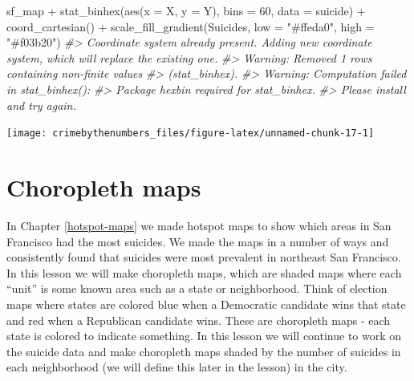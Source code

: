 \documentclass[
  12pt,
  openany]{book}
\newenvironment{Shaded}{\begin{snugshade}}{\end{snugshade}}
\newcommand{\AttributeTok}[1]{\textcolor[rgb]{0.61,0.61,0.61}{#1}}
\newcommand{\CommentTok}[1]{\textcolor[rgb]{0.37,0.37,0.37}{\textit{#1}}}
\newcommand{\DecValTok}[1]{\textcolor[rgb]{0.06,0.06,0.06}{#1}}
\newcommand{\FunctionTok}[1]{\textcolor[rgb]{0,0,0}{#1}}
\newcommand{\NormalTok}[1]{#1}
\newcommand{\SpecialCharTok}[1]{\textcolor[rgb]{0,0,0}{#1}}
\newcommand{\StringTok}[1]{\textcolor[rgb]{0.5,0.5,0.5}{#1}}
\begin{document}
\begin{Shaded}
\begin{Highlighting}[]
\NormalTok{sf\_map }\SpecialCharTok{+}
  \FunctionTok{stat\_binhex}\NormalTok{(}\FunctionTok{aes}\NormalTok{(}\AttributeTok{x =}\NormalTok{ X, }\AttributeTok{y =}\NormalTok{ Y),}
              \AttributeTok{bins  =} \DecValTok{60}\NormalTok{,}
              \AttributeTok{data =}\NormalTok{ suicide) }\SpecialCharTok{+}
  \FunctionTok{coord\_cartesian}\NormalTok{() }\SpecialCharTok{+}
  \FunctionTok{scale\_fill\_gradient}\NormalTok{(}\StringTok{\textquotesingle{}Suicides\textquotesingle{}}\NormalTok{,}
                      \AttributeTok{low =} \StringTok{"\#ffeda0"}\NormalTok{,}
                      \AttributeTok{high =} \StringTok{"\#f03b20"}\NormalTok{)}
\CommentTok{\#\textgreater{} Coordinate system already present. Adding new coordinate system, which will replace the existing one.}
\CommentTok{\#\textgreater{} Warning: Removed 1 rows containing non{-}finite values}
\CommentTok{\#\textgreater{} (stat\_binhex).}
\CommentTok{\#\textgreater{} Warning: Computation failed in \textasciigrave{}stat\_binhex()\textasciigrave{}:}
\CommentTok{\#\textgreater{}   Package \textasciigrave{}hexbin\textasciigrave{} required for \textasciigrave{}stat\_binhex\textasciigrave{}.}
\CommentTok{\#\textgreater{}   Please install and try again.}
\end{Highlighting}
\end{Shaded}

\begin{center}\texttt{[image: crimebythenumbers\_files/figure-latex/unnamed-chunk-17-1]} \end{center}

\hypertarget{choropleth-maps}{%
\chapter{Choropleth maps}\label{choropleth-maps}}

In Chapter \ref{hotspot-maps} we made hotspot maps to show which areas in San Francisco had the most suicides. We made the maps in a number of ways and consistently found that suicides were most prevalent in northeast San Francisco. In this lesson we will make choropleth maps, which are shaded maps where each ``unit'' is some known area such as a state or neighborhood. Think of election maps where states are colored blue when a Democratic candidate wins that state and red when a Republican candidate wins. These are choropleth maps - each state is colored to indicate something. In this lesson we will continue to work on the suicide data and make choropleth maps shaded by the number of suicides in each neighborhood (we will define this later in the lesson) in the city.
\end{document}
